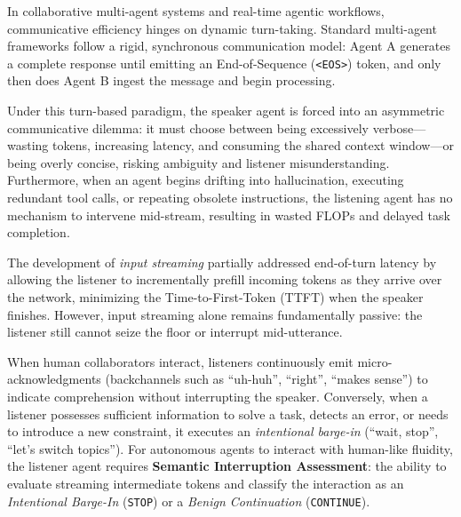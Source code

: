 \documentclass{article}
\begin{document}
In collaborative multi-agent systems and real-time agentic workflows, communicative efficiency hinges on dynamic turn-taking. Standard multi-agent frameworks follow a rigid, synchronous communication model: Agent A generates a complete response until emitting an End-of-Sequence (\texttt{<EOS>}) token, and only then does Agent B ingest the message and begin processing. 

Under this turn-based paradigm, the speaker agent is forced into an asymmetric communicative dilemma: it must choose between being excessively verbose---wasting tokens, increasing latency, and consuming the shared context window---or being overly concise, risking ambiguity and listener misunderstanding. Furthermore, when an agent begins drifting into hallucination, executing redundant tool calls, or repeating obsolete instructions, the listening agent has no mechanism to intervene mid-stream, resulting in wasted FLOPs and delayed task completion.

The development of \textit{input streaming} partially addressed end-of-turn latency by allowing the listener to incrementally prefill incoming tokens as they arrive over the network, minimizing the Time-to-First-Token (TTFT) when the speaker finishes. However, input streaming alone remains fundamentally passive: the listener still cannot seize the floor or interrupt mid-utterance.

When human collaborators interact, listeners continuously emit micro-acknowledgments (backchannels such as ``uh-huh'', ``right'', ``makes sense'') to indicate comprehension without interrupting the speaker. Conversely, when a listener possesses sufficient information to solve a task, detects an error, or needs to introduce a new constraint, it executes an \textit{intentional barge-in} (``wait, stop'', ``let's switch topics''). For autonomous agents to interact with human-like fluidity, the listener agent requires \textbf{Semantic Interruption Assessment}: the ability to evaluate streaming intermediate tokens and classify the interaction as an \textit{Intentional Barge-In} (\texttt{STOP}) or a \textit{Benign Continuation} (\texttt{CONTINUE}).
\end{document}
